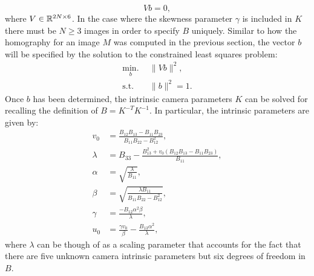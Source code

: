 \begin{equation} \label{eq:allbconst}
    Vb = 0,
\end{equation}
where $V \in \mathbb{R}^{2N \times 6}$. In the case where the skewness parameter $\gamma$ is included in $K$ there must be $N \geq 3$ images in order to specify $B$ uniquely. Similar to how the homography for an image $M$ was computed in the previous section, the vector $b$ will be specified by the solution to the constrained least squares problem:
\begin{equation} \label{eq:bopt}
\begin{split}
\underset{b}{\text{min.}} \:\:& \lVert Vb \rVert^2, \\
    \text{s.t.}\:\:& \lVert b \rVert^2 = 1.
\end{split}
\end{equation}
Once $b$ has been determined, the intrinsic camera parameters $K$ can be solved for recalling the definition of $B = K^{-T}K^{-1}$. In particular, the intrinsic parameters are given by:
\begin{equation} \label{eq:B2K}
\begin{split}
    v_0 &= \frac{B_{12}B_{13} - B_{11}B_{23}}{B_{11}B_{22} - B_{12}^2}, \\
    \lambda &= B_{33} - \frac{B_{13}^2 + v_0(B_{12}B_{13} - B_{11}B_{23})}{B_{11}}, \\
    \alpha &= \sqrt{\frac{\lambda}{B_{11}}}, \\
    \beta &= \sqrt{\frac{\lambda B_{11}}{B_{11}B_{22} - B_{12}^2}}, \\
    \gamma &= \frac{-B_{12}\alpha^2\beta}{\lambda}, \\
    u_0 &= \frac{\gamma v_0}{\beta} - \frac{B_{13}\alpha^2}{\lambda},
\end{split}
\end{equation}
where $\lambda$ can be though of as a scaling parameter that accounts for the fact that there are five unknown camera intrinsic parameters but six degrees of freedom in $B$.

